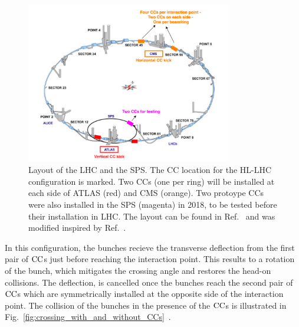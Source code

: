 \begin{figure}[!h] %
    \centering         
    \includegraphics[width=0.8\textwidth]{images/introduction/LHC_layout_CCs.png}
        \caption{Layout of the LHC and the SPS. The CC location for the HL-LHC configuration is marked. Two CCs (one per ring) will be installed at each side of ATLAS (red) and CMS (orange). Two protoype CCs were also installed in the SPS (magenta) in 2018, to be tested before their installation in LHC. The layout can be found in Ref.~\cite{LHC_SPS_layout} and was modified inspired by Ref.~\cite{LHC_SPS_layout_v2}.}
        \label{fig:LHC_layout_CCs}
 \end{figure}

In this configuration, the bunches recieve the transverse deflection from the first pair of ${\mathrm{CC}}$s just before reaching the interaction point. This results to a rotation of the bunch, which mitigates the crossing angle and restores the head-on collisions. The deflection, is cancelled once the bunches reach the second pair of ${\mathrm{CC}}$s which are symmetrically installed at the opposite side of the interaction point. The collision of the bunches in the presence of the ${\mathrm{CC}}$s is illustrated in Fig.~\ref{fig:crossing_with_and_without_CCs}~\cite{Verdú-Andrés:2263119}.

